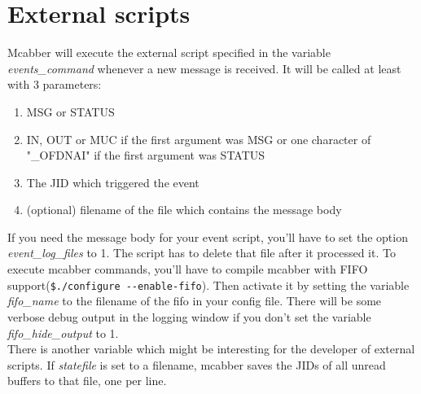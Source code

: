 \documentclass[12pt,oneside,a4]{book}
\begin{document}
\section{External scripts}
Mcabber will execute the external script specified in the variable \textit{events\_command} whenever a new
message is received. It will be called at least with 3 parameters:
\begin{enumerate}
	\item MSG or STATUS
	\item	IN, OUT or MUC if the first argument was MSG or one character of "\_OFDNAI" if the first argument was STATUS
	\item The JID which triggered the event
	\item (optional) filename of the file which contains the message body
\end{enumerate}
If you need the message body for your event script, you'll have to set the option \textit{event\_log\_files} to 1.
The script has to delete that file after it processed it. To execute mcabber commands,
you'll have to compile mcabber with FIFO support(\verb+$./configure --enable-fifo+). Then activate it by setting the
variable \textit{fifo\_name} to the filename of the fifo in your config file. There will be some verbose debug
output in the logging window if you don't set the variable \textit{fifo\_hide\_output} to 1.\\
There is another variable which might be interesting for the developer of external scripts.
If \textit{statefile} is set to a filename, mcabber saves the JIDs of all unread buffers to that file, one per line.
\end{document}
